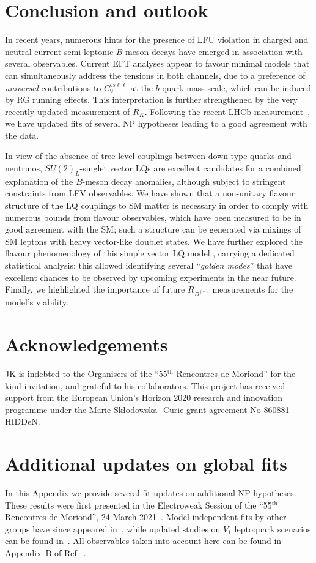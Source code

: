 \documentclass[a4paper,11pt]{article}
\def\rdrds{R_{D^{(\ast)}}}
\def\rk{R_{K}}
\begin{document}
\section{Conclusion and outlook}
In recent years, numerous hints for the presence of LFU violation in charged and neutral current semi-leptonic $B$-meson decays have emerged in association with several observables.
Current EFT analyses appear to favour minimal models that can simultaneously address the tensions in both channels, due to a preference of {\it universal} contributions to $C_9^{bs\ell\ell}$ at the $b$-quark mass scale, which can be induced by RG running effects.
This interpretation is further strengthened by the very recently updated measurement of $\rk$.
Following the recent LHCb measurement~\cite{Aaij:2021vac}, we have updated fits of several NP hypotheses leading to a good agreement with the data.

In view of the absence of tree-level couplings between down-type quarks and neutrinos, 
$SU(2)_L$-singlet vector LQs are excellent candidates for a combined explanation of the $B$-meson decay anomalies, 
although subject to stringent constraints from LFV observables.
We have shown that a non-unitary flavour structure of the LQ couplings to SM matter is necessary in order to comply with numerous bounds from flavour observables, which have been measured to be in good agreement with the SM; such a structure can be generated via mixings of SM leptons with heavy vector-like doublet states.
We have further explored the flavour phenomenology of this simple vector LQ model , carrying a dedicated statistical analysis; this allowed identifying several ``{\it golden modes}'' that have excellent chances to be observed by upcoming experiments in the near future.
Finally, we highlighted the importance of future $\rdrds$ measurements for the model's viability.

\section*{Acknowledgements}
JK is indebted to the Organisers of the ``55$^\text{th}$ Rencontres de Moriond'' for the kind invitation, and grateful to his collaborators.
This project has received support from the European Union’s Horizon 2020 research and innovation programme under the Marie Skłodowska -Curie grant agreement No 860881-HIDDeN.

\appendix
\section{Additional updates on global fits}
\label{app:fits}
In this Appendix we provide several fit updates on additional NP hypotheses. These results were first presented in the Electroweak Session of the ``55$^\text{th}$ Rencontres de Moriond'', 24 March 2021~\cite{talk}.
Model-independent fits by other groups have since appeared in~\cite{fits}, while updated studies on $V_1$ leptoquark scenarios can be found in~\cite{LQ2021}.
All observables taken into account here can be found in Appendix~B of Ref.~\cite{LQ2020}.
\end{document}
